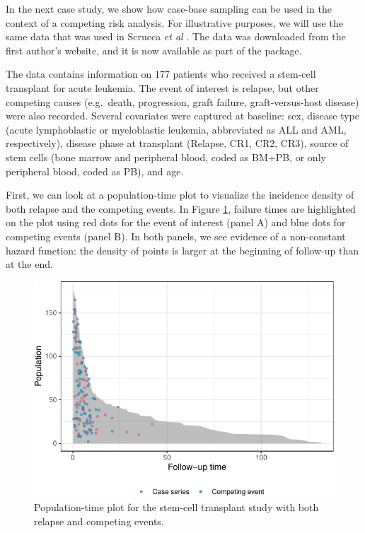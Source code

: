 \documentclass[
]{jss}
\begin{document}
In the next case study, we show how case-base sampling can be used in
the context of a competing risk analysis. For illustrative purposes, we
will use the same data that was used in Scrucca \emph{et al}
\citeyearpar{scrucca2010regression}. The data was downloaded from the
first author's website, and it is now available as part of the
 package.

The data contains information on 177 patients who received a stem-cell
transplant for acute leukemia. The event of interest is relapse, but
other competing causes (e.g.~death, progression, graft failure,
graft-versus-host disease) were also recorded. Several covariates were
captured at baseline: sex, disease type (acute lymphoblastic or
myeloblastic leukemia, abbreviated as ALL and AML, respectively),
disease phase at transplant (Relapse, CR1, CR2, CR3), source of stem
cells (bone marrow and peripheral blood, coded as BM+PB, or only
peripheral blood, coded as PB), and age.

First, we can look at a population-time plot to visualize the incidence
density of both relapse and the competing events. In Figure
\ref{fig:compPop}, failure times are highlighted on the plot using red
dots for the event of interest (panel A) and blue dots for competing
events (panel B). In both panels, we see evidence of a non-constant
hazard function: the density of points is larger at the beginning of
follow-up than at the end.

\begin{CodeChunk}
\begin{figure}[ht]

{\centering \includegraphics[width=\textwidth,keepaspectratio=true]{../figures/compPop-1} 

}

\caption[Population-time plot for the stem-cell transplant study with both relapse and competing events]{Population-time plot for the stem-cell transplant study with both relapse and competing events.}\label{fig:compPop}
\end{figure}
\end{CodeChunk}
\end{document}
